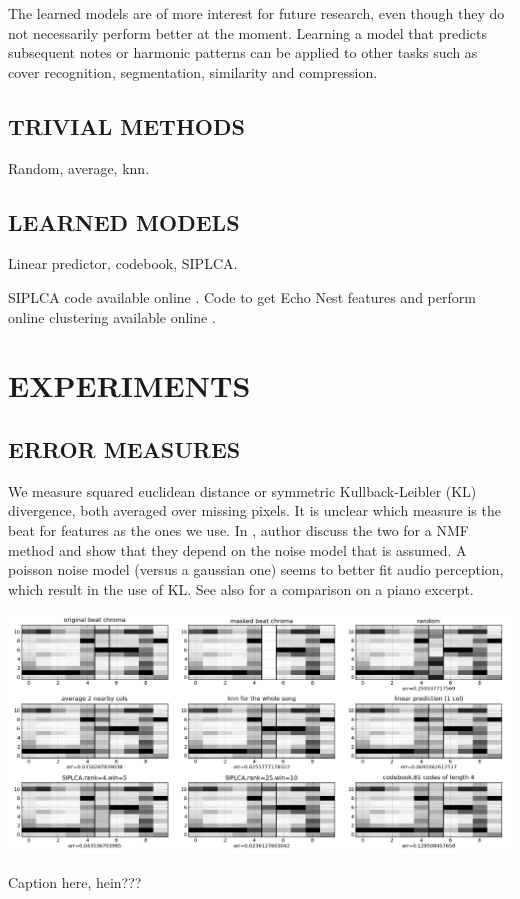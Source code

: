 \documentclass{article}
\begin{document}
The learned models are of more interest for future research, even though they do not
necessarily perform better at the moment. Learning a model that predicts subsequent
notes or harmonic patterns can be applied to other tasks such as cover recognition,
segmentation, similarity and compression.

\subsection{TRIVIAL METHODS}
\label{ssec:trivialmethods}

Random, average, knn.

\subsection{LEARNED MODELS}
\label{ssec:learnedmodels}

Linear predictor, codebook, SIPLCA.

SIPLCA code available online \cite{Weiss2010}. Code to get Echo Nest features and perform
online clustering available online \cite{Bertin-Mahieux2010a}.

\section{EXPERIMENTS}
\label{sec:page}

\subsection{ERROR MEASURES}
\label{ssec:errmeasures}
We measure squared euclidean distance or symmetric Kullback-Leibler (KL) divergence,
both averaged over missing pixels. It is unclear which measure is the beat for features
as the ones we use. In \cite{Sajda2003}, author discuss the two for
a NMF method and show that they depend on the noise model that is assumed.
A poisson noise model (versus a gaussian one) seems to better fit audio perception, 
which result in the use of KL. See also \cite{Fevotte2009} for a comparison on a piano
excerpt.

\centering
\centerline{\includegraphics[width=\columnwidth]{imputation}}
\vspace{.1cm}
\centerline{Caption here, hein???}\medskip
\end{document}
